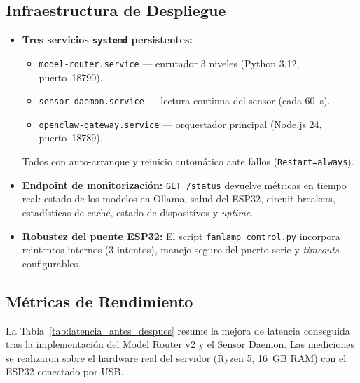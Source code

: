 \subsection{Infraestructura de Despliegue}
\label{sec:infraestructura_despliegue}

\begin{itemize}
    \item \textbf{Tres servicios \texttt{systemd} persistentes:}
    \begin{itemize}
        \item \texttt{model-router.service} --- enrutador 3 niveles (Python 3.12, puerto~18790).
        \item \texttt{sensor-daemon.service} --- lectura continua del sensor (cada 60~s).
        \item \texttt{openclaw-gateway.service} --- orquestador principal (Node.js 24, puerto~18789).
    \end{itemize}
    Todos con auto-arranque y reinicio automático ante fallos (\texttt{Restart=always}).
    
    \item \textbf{Endpoint de monitorización:} \texttt{GET /status} devuelve métricas en tiempo real: estado de los modelos en Ollama, salud del ESP32, circuit breakers, estadísticas de caché, estado de dispositivos y \textit{uptime}.
    
    \item \textbf{Robustez del puente ESP32:} El script \texttt{fanlamp\_control.py} incorpora reintentos internos (3 intentos), manejo seguro del puerto serie y \textit{timeouts} configurables.
\end{itemize}

\subsection{Métricas de Rendimiento}
\label{sec:metricas_rendimiento}

La Tabla~\ref{tab:latencia_antes_despues} resume la mejora de latencia conseguida tras la implementación del Model Router v2 y el Sensor Daemon. Las mediciones se realizaron sobre el hardware real del servidor (Ryzen 5, 16~GB RAM) con el ESP32 conectado por USB.

